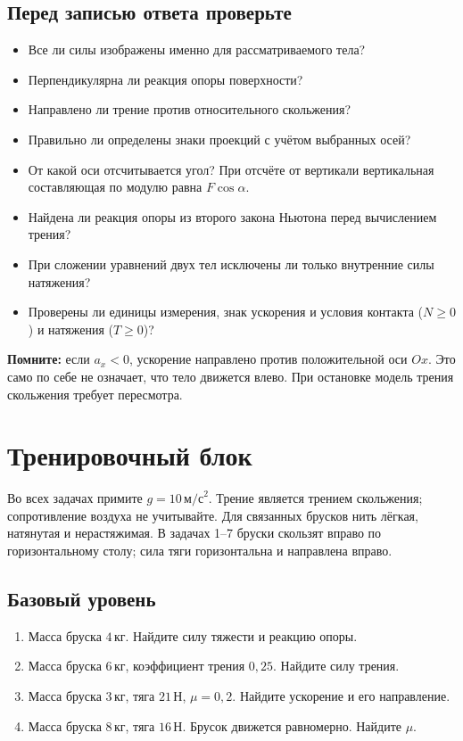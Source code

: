 \documentclass[a4paper,12pt]{article}
\newcommand{\unit}[1]{\,\text{#1}}
\begin{document}
\subsection{Перед записью ответа проверьте}
\begin{itemize}[label=$\square$,itemsep=7pt]
\item Все ли силы изображены именно для рассматриваемого тела?
\item Перпендикулярна ли реакция опоры поверхности?
\item Направлено ли трение против относительного скольжения?
\item Правильно ли определены знаки проекций с учётом выбранных осей?
\item От какой оси отсчитывается угол? При отсчёте от вертикали вертикальная составляющая по модулю равна $F\cos\alpha$.
\item Найдена ли реакция опоры из второго закона Ньютона перед вычислением трения?
\item При сложении уравнений двух тел исключены ли только внутренние силы натяжения?
\item Проверены ли единицы измерения, знак ускорения и условия контакта ($N\geq0$) и натяжения ($T\geq0$)?
\end{itemize}
\textcolor{darkaccent}{\textbf{Помните:}} если $a_x<0$, ускорение направлено против положительной оси $Ox$. Это само по себе не означает, что тело движется влево. При остановке модель трения скольжения требует пересмотра.
\clearpage
\section*{Тренировочный блок}
Во всех задачах примите $g=10\unit{м/с}^2$. Трение является трением скольжения; сопротивление воздуха не учитывайте. Для связанных брусков нить лёгкая, натянутая и нерастяжимая. В задачах 1--7 бруски скользят вправо по горизонтальному столу; сила тяги горизонтальна и направлена вправо.
\subsection{Базовый уровень}
\begin{enumerate}[itemsep=5pt]
\item Масса бруска $4\unit{кг}$. Найдите силу тяжести и реакцию опоры.
\item Масса бруска $6\unit{кг}$, коэффициент трения $0,25$. Найдите силу трения.
\item Масса бруска $3\unit{кг}$, тяга $21\unit{Н}$, $\mu=0,2$. Найдите ускорение и его направление.
\item Масса бруска $8\unit{кг}$, тяга $16\unit{Н}$. Брусок движется равномерно. Найдите $\mu$.
\end{enumerate}
\end{document}
